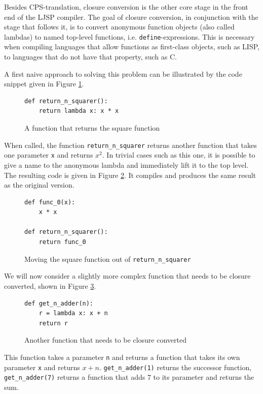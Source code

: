 \documentclass[11pt]{report}
\begin{document}

Besides CPS-translation, closure conversion is the other core stage in the front end of the LJSP compiler. The goal of closure conversion, in conjunction with the stage that follows it, is to convert anonymous function objects (also called lambdas) to named top-level functions, i.e. \texttt{define}-expressions. This is necessary when compiling languages that allow functions as first-class objects, such as LISP, to languages that do not have that property, such as C.

A first naive approach to solving this problem can be illustrated by the code snippet given in Figure \ref{cc1}.

\begin{figure}[h!]
\begin{lstlisting}
def return_n_squarer():
    return lambda x: x * x
\end{lstlisting}
\caption{A function that returns the square function}
\label{cc1}
\end{figure}

When called, the function \texttt{return_n_squarer} returns another function that takes one parameter \texttt{x} and returns $x^2$. In trivial cases such as this one, it is possible to give a name to the anonymous lambda and immediately lift it to the top level. The resulting code is given in Figure \ref{cc2}. It compiles and produces the same result as the original version.

\begin{figure}[h!]
\begin{lstlisting}
def func_0(x):
    x * x
    
def return_n_squarer():
    return func_0
\end{lstlisting}
\caption{Moving the square function out of \texttt{return_n_squarer}}
\label{cc2}
\end{figure}

We will now consider a slightly more complex function that needs to be closure converted, shown in Figure \ref{cc3}.

\begin{figure}[ht]
\begin{lstlisting}
def get_n_adder(n):
    r = lambda x: x + n
    return r
\end{lstlisting}
\caption{Another function that needs to be closure converted}
\label{cc3}
\end{figure}

This function takes a parameter \texttt{n} and returns a function that takes its own parameter \texttt{x} and returns $x+n$. \texttt{get_n_adder(1)} returns the successor function, \texttt{get_n_adder(7)} returns a function that adds $7$ to its parameter and returns the sum.
\end{document}
